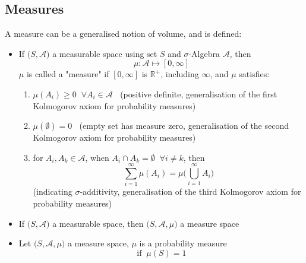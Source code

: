 \subsection*{Measures}
A measure can be a generalised notion of volume, and is defined:
\begin{itemize}
    \item If $\big( S, \mathcal{A}\big)$ a measurable space using set $S$ and $\sigma$-Algebra $\mathcal{A}$, then $$ \mu: \mathcal{A} \mapsto [0,\infty]$$
    $\mu$ is called a "measure" if $[0,\infty]$ is $\mathbb{R}^+$, including $\infty$, and $\mu$ satisfies:
    \begin{enumerate}
        \item $\mu (A_i) \geq 0 \;\; \forall A_i\in \mathcal{A}\;\;$ (positive definite, generalisation of the first Kolmogorov axiom for probability measures)
        \item $\mu(\emptyset) = 0 \;\;$ (empty set has measure zero, generalisation of the second Kolmogorov axiom for probability measures) 
        \item for $A_i, A_k \in \mathcal{A}$, when $A_i\cap A_k = \emptyset \;\; \forall i\neq k$, then $$ \sum \limits_{i=1}^{\infty} \mu(A_i) = \mu\Big( \bigcup\limits_{i=1}^{\infty} A_i\Big)$$
        (indicating $\sigma$-additivity, generalisation of the third Kolmogorov axiom for probability measures)
    \end{enumerate}
    \item If $\big( S, \mathcal{A}\big)$ a measurable space, then $\big( S, \mathcal{A}, \mu \big)$ a measure space
    \item Let $\big( S, \mathcal{A}, \mu \big)$ a measure space,  $\mu$ is a probability measure 
    $$ \mbox{if} \;\; \mu(S) = 1 $$
\end{itemize}
 
